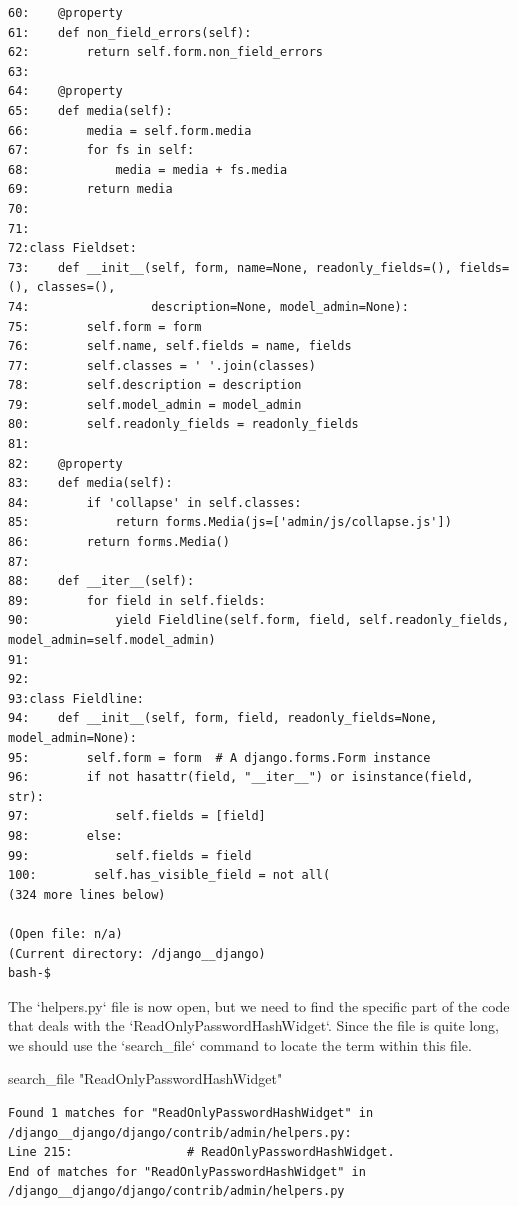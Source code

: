 {\begin{observationbox}
\begin{Verbatim}[breaklines=true, breakanywhere=true]
60:    @property
61:    def non_field_errors(self):
62:        return self.form.non_field_errors
63:
64:    @property
65:    def media(self):
66:        media = self.form.media
67:        for fs in self:
68:            media = media + fs.media
69:        return media
70:
71:
72:class Fieldset:
73:    def __init__(self, form, name=None, readonly_fields=(), fields=(), classes=(),
74:                 description=None, model_admin=None):
75:        self.form = form
76:        self.name, self.fields = name, fields
77:        self.classes = ' '.join(classes)
78:        self.description = description
79:        self.model_admin = model_admin
80:        self.readonly_fields = readonly_fields
81:
82:    @property
83:    def media(self):
84:        if 'collapse' in self.classes:
85:            return forms.Media(js=['admin/js/collapse.js'])
86:        return forms.Media()
87:
88:    def __iter__(self):
89:        for field in self.fields:
90:            yield Fieldline(self.form, field, self.readonly_fields, model_admin=self.model_admin)
91:
92:
93:class Fieldline:
94:    def __init__(self, form, field, readonly_fields=None, model_admin=None):
95:        self.form = form  # A django.forms.Form instance
96:        if not hasattr(field, "__iter__") or isinstance(field, str):
97:            self.fields = [field]
98:        else:
99:            self.fields = field
100:        self.has_visible_field = not all(
(324 more lines below)

(Open file: n/a)
(Current directory: /django__django)
bash-$
\end{Verbatim}
\end{observationbox}
\begin{agentbox}
The `helpers.py` file is now open, but we need to find the specific part of the code that deals with the `ReadOnlyPasswordHashWidget`. Since the file is quite long, we should use the `search\_file` command to locate the term within this file.



\hrulefill
\begin{CodeVerbatim}[breaklines=true, breakanywhere=true]
search_file "ReadOnlyPasswordHashWidget"
\end{CodeVerbatim}
\end{agentbox}
\begin{observationbox}\begin{Verbatim}[breaklines=true, breakanywhere=true]
Found 1 matches for "ReadOnlyPasswordHashWidget" in /django__django/django/contrib/admin/helpers.py:
Line 215:                # ReadOnlyPasswordHashWidget.
End of matches for "ReadOnlyPasswordHashWidget" in /django__django/django/contrib/admin/helpers.py


\end{Verbatim}
\end{observationbox}}

